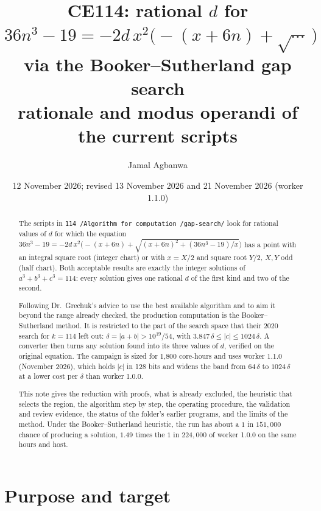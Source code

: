 \documentclass[11pt,a4paper]{article}
\title{CE114: rational $d$ for $36n^3-19=-2d\,x^2\bigl(-(x+6n)+\sqrt{\cdots}\,\bigr)$\\
via the Booker--Sutherland gap search\\[2pt]
\large rationale and modus operandi of the current scripts}
\author{Jamal Agbanwa}
\date{12 November 2026; revised 13 November 2026 and 21 November 2026 (worker 1.1.0)}
\theoremstyle{remark}
\begin{document}
\maketitle

\begin{abstract}
The scripts in \texttt{114 /Algorithm for computation /gap-search/} look for rational values of
$d$ for which the equation
$36n^3-19=-2d\,x^2\bigl(-(x+6n)+\sqrt{(x+6n)^2+(36n^3-19)/x}\bigr)$ has a point with an
integral square root (integer chart) or with $x=X/2$ and square root $Y/2$, $X,Y$ odd (half
chart). Both acceptable results are exactly the integer solutions of $a^3+b^3+c^3=114$: every
solution gives one rational $d$ of the first kind and two of the second.

Following Dr.\ Grechuk's advice to use the best available algorithm and to aim it beyond the
range already checked, the production computation is the Booker--Sutherland method. It is
restricted to the part of the search space that their 2020 search for $k=114$ left out:
$\delta=|a+b|>10^{19}/54$, with $3.847\,\delta\le|c|\le1024\,\delta$. A converter then turns
any solution found into its three values of $d$, verified on the original equation. The
campaign is sized for 1{,}800 core-hours and uses worker 1.1.0 (November 2026), which holds
$|c|$ in 128 bits and widens the band from $64\,\delta$ to $1024\,\delta$ at a lower cost per
$\delta$ than worker 1.0.0.

This note gives the reduction with proofs, what is already excluded, the heuristic that
selects the region, the algorithm step by step, the operating procedure, the validation and
review evidence, the status of the folder's earlier programs, and the limits of the method.
Under the Booker--Sutherland heuristic, the run has about a $1$ in $151{,}000$ chance of
producing a solution, $1.49$ times the $1$ in $224{,}000$ of worker 1.0.0 on the same hours and
host.
\end{abstract}

\tableofcontents

\section{Purpose and target}
\end{document}
